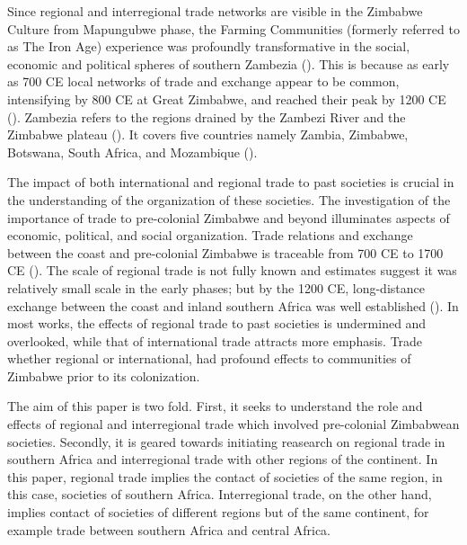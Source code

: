 Since regional and interregional trade networks are visible in the Zimbabwe Culture from Mapungubwe phase, the Farming Communities (formerly referred to as The Iron Age) experience was  profoundly transformative in the social, economic and political spheres of southern Zambezia (\cite[][]{pikirayi2007}). This is because as early as 700 CE local networks of trade and exchange appear to be common, intensifying by 800 CE at Great Zimbabwe, and  reached their peak by 1200 CE (\cites[][]{kusimba1999}[][]{kim2008}). Zambezia refers to the regions drained by the Zambezi River and the Zimbabwe plateau (\cite[][3]{pikirayi2001}). It covers five countries namely Zambia, Zimbabwe, Botswana, South Africa, and Mozambique (\cite[][]{kim2008}).

The impact of both international and regional trade to past societies is crucial in the understanding of the organization of these societies. The investigation of the importance of trade to pre-colonial Zimbabwe and beyond illuminates aspects of economic, political, and social organization. Trade relations and exchange between the coast and pre-colonial Zimbabwe is traceable from 700 CE to 1700 CE (\cite[][]{pwiti2005}). The scale of regional trade is not fully known and estimates suggest it was relatively small scale in the early phases; but by the 1200 CE,  long-distance exchange between the coast and inland southern Africa was well established (\cites[][]{pwiti1991}[][]{pwiti2005}[][]{chiripanhura2017}). In most works, the effects of regional trade to past societies is undermined and overlooked, while that of international trade attracts more emphasis. Trade whether regional or international, had profound effects to communities of Zimbabwe prior to its colonization.

The aim of this paper is two fold. First, it seeks to understand the role and effects of regional and interregional trade which involved pre-colonial Zimbabwean societies. Secondly, it is geared towards initiating reasearch on regional trade in southern Africa and interregional trade with other regions of the continent. In this paper, regional trade implies the contact of societies of the same region, in this case, societies of southern Africa. Interregional trade, on the other hand, implies contact of societies of different regions but of the same continent, for example trade between southern Africa and central Africa.



